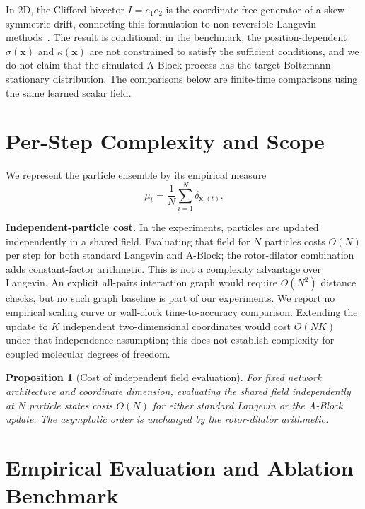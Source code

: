 \documentclass{article}
\newtheorem{proposition}[definition]{Proposition}
\begin{document}
In 2D, the Clifford bivector $I=e_1e_2$ is the coordinate-free generator of a skew-symmetric drift, connecting this formulation to non-reversible Langevin methods~\citep{hwang2005accelerating, lelievre2013optimal, duncan2016variance}. The result is conditional: in the benchmark, the position-dependent $\sigma(\mathbf{x})$ and $\kappa(\mathbf{x})$ are not constrained to satisfy the sufficient conditions, and we do not claim that the simulated A-Block process has the target Boltzmann stationary distribution. The comparisons below are finite-time comparisons using the same learned scalar field.

\section{Per-Step Complexity and Scope}

We represent the particle ensemble by its empirical measure
\begin{equation}
\mu_t = \frac{1}{N} \sum_{i=1}^{N} \delta_{\mathbf{x}_i(t)}.
\end{equation}

\textbf{Independent-particle cost.} In the experiments, particles are updated independently in a shared field. Evaluating that field for $N$ particles costs $O(N)$ per step for both standard Langevin and A-Block; the rotor-dilator combination adds constant-factor arithmetic. This is not a complexity advantage over Langevin. An explicit all-pairs interaction graph would require $O(N^2)$ distance checks, but no such graph baseline is part of our experiments. We report no empirical scaling curve or wall-clock time-to-accuracy comparison. Extending the update to $K$ independent two-dimensional coordinates would cost $O(NK)$ under that independence assumption; this does not establish complexity for coupled molecular degrees of freedom.

\begin{proposition}[Cost of independent field evaluation]
\label{prop:complexity}
For fixed network architecture and coordinate dimension, evaluating the shared field independently at $N$ particle states costs $O(N)$ for either standard Langevin or the A-Block update. The asymptotic order is unchanged by the rotor-dilator arithmetic.
\end{proposition}

\section{Empirical Evaluation and Ablation Benchmark}
\end{document}
